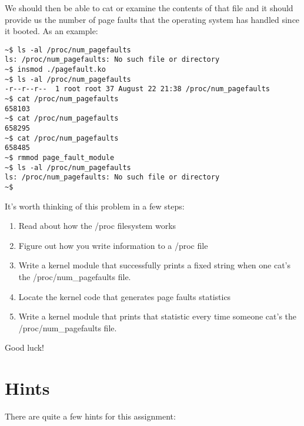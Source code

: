 \documentclass[11pt]{article}
\begin{document}
\newpage

We should then be able to cat or examine the contents of that file and it should provide us the number of page faults that the operating system has handled since it booted. As an example:

\begin{verbatim}
~$ ls -al /proc/num_pagefaults
ls: /proc/num_pagefaults: No such file or directory
~$ insmod ./pagefault.ko 
~$ ls -al /proc/num_pagefaults
-r--r--r--  1 root root 37 August 22 21:38 /proc/num_pagefaults
~$ cat /proc/num_pagefaults 
658103
~$ cat /proc/num_pagefaults 
658295
~$ cat /proc/num_pagefaults 
658485
~$ rmmod page_fault_module
~$ ls -al /proc/num_pagefaults
ls: /proc/num_pagefaults: No such file or directory
~$
\end{verbatim}

It's worth thinking of this problem in a few steps:

\begin{enumerate}
\item Read about how the /proc filesystem works
\item Figure out how you write information to a /proc file
\item Write a kernel module that successfully prints a fixed string when one cat's the /proc/num\_pagefaults file. 
\item Locate the kernel code that generates page faults statistics
\item Write a kernel module that prints that statistic every time someone cat's the /proc/num\_pagefaults file.
\end{enumerate}

Good luck!

\section*{Hints}

There are quite a few hints for this assignment:
\end{document}
